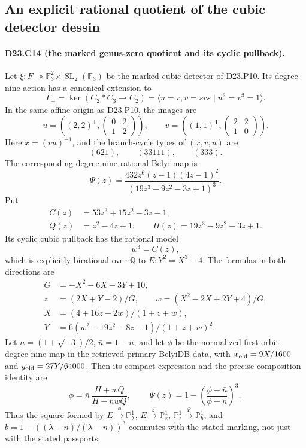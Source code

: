 \subsection{An explicit rational quotient of the cubic detector dessin}

\paragraph{D23.C14 (the marked genus-zero quotient and its cyclic pullback).}
Let $\xi:F\twoheadrightarrow\mathbb F_3^2\rtimes\operatorname{SL}_2(\mathbb F_3)$
be the marked cubic detector of D23.P10. Its degree-nine action has a
canonical extension to
\[
 \Gamma_+=\ker(C_2*C_3\longrightarrow C_2)
       =\langle u=r,v=srs\mid u^3=v^3=1\rangle.
\]
In the same affine origin as D23.P10, the images are
\[
 u=\left((2,2)^{\mathsf T},
       \begin{pmatrix}0&2\\1&2\end{pmatrix}\right),\qquad
 v=\left((1,1)^{\mathsf T},
       \begin{pmatrix}2&2\\1&0\end{pmatrix}\right).
\tag{D23.C14.1}
\]
Here $x=(vu)^{-1}$, and the branch-cycle types of $(x,v,u)$ are
\[
                   (621),\qquad(33111),\qquad(333).
\tag{D23.C14.2}
\]
The corresponding degree-nine rational Belyi map is
\[
 \Psi(z)=\frac{432z^6(z-1)(4z-1)^2}
                   {(19z^3-9z^2-3z+1)^3}.
\tag{D23.C14.3}
\]
Put
\[
 \begin{split}
 C(z)&=53z^3+15z^2-3z-1,\\
 Q(z)&=z^2-4z+1,\qquad H(z)=19z^3-9z^2-3z+1.
 \end{split}
\]
Its cyclic cubic pullback has the rational model
\[
                  w^3=C(z),
\tag{D23.C14.4}
\]
which is explicitly birational over $\mathbb Q$ to
$E:Y^2=X^3-4$. The formulas in both directions are
\[
 \begin{split}
 G&=-X^2-6X-3Y+10,\\
 z&=(2X+Y-2)/G,\qquad w=(X^2-2X+2Y+4)/G,\\
 X&=(4+16z-2w)/(1+z+w),\\
 Y&=6(w^2-19z^2-8z-1)/(1+z+w)^2.
 \end{split}
\tag{D23.C14.5}
\]
Let $n=(1+\sqrt{-3})/2$, $\bar n=1-n$, and let $\phi$ be the
normalized first-orbit degree-nine map in the retrieved primary BelyiDB data,
with $x_{\rm old}=9X/1600$ and $y_{\rm old}=27Y/64000$.
Then its compact expression and the precise composition identity are
\[
 \phi=\bar n\,\frac{H+wQ}{H-nwQ},\qquad
 \boxed{\ \Psi(z)=1-\left(\frac{\phi-\bar n}{\phi-n}\right)^3.\ }
\tag{D23.C14.6}
\]
Thus the square formed by $E\xrightarrow{\phi}\mathbb P^1_\lambda$,
$E\xrightarrow{z}\mathbb P^1_z$, $\mathbb P^1_z\xrightarrow{\Psi}\mathbb P^1_b$,
and $b=1-((\lambda-\bar n)/(\lambda-n))^3$ commutes with the stated
marking, not just with the stated passports.

